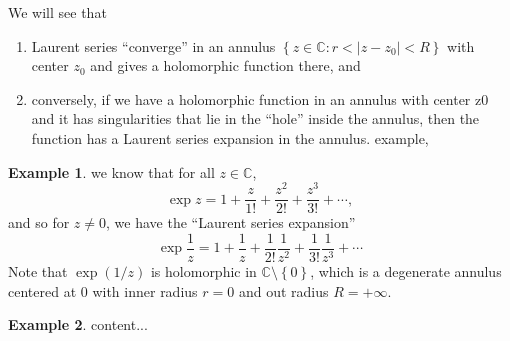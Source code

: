 \documentclass[12pt,openany]{book}
\theoremstyle{definition}
\newtheorem{example}{Example}[section]
\newcommand{\set}[1]{\left\{#1\right\}}
\newcommand{\C}{\mathbb{C}}
\newcommand{\abs}[1]{\left\lvert #1 \right\rvert}
\begin{document}
	We will see that \begin{enumerate}[(1)]
		\item Laurent series ``converge'' in an annulus $\set{z\in\C:r<\abs{z-z_0}<R}$ with center $z_0$ and gives a holomorphic function there, and
		\item conversely, if we have a holomorphic function in an annulus with center
		z0 and it has singularities that lie in the ``hole'' inside the annulus,
		then the function has a Laurent series expansion in the annulus.
		example, 
	\end{enumerate}
	\vspace{8pt}
	\begin{example}
		we know that for all $z\in\C$, \[
		\exp z=1+\frac{z}{1!}+\frac{z^2}{2!}+\frac{z^3}{3!}+\cdots,
		\] and so for $z\neq 0$, we have the ``Laurent series expansion'' \[
		\exp\frac{1}{z}=1+\frac{1}{z}+\frac{1}{2!}\frac{1}{z^2}+\frac{1}{3!}\frac{1}{z^3}+\cdots
		\] Note that $\exp(1/z)$ is holomorphic in $\C\setminus\set{0}$, which is a degenerate annulus centered at $0$ with inner radius $r=0$ and out radius $R=+\infty$.
	\end{example}
	\vspace{4pt}
	\begin{example}
		content...
	\end{example}
	
\end{document}
